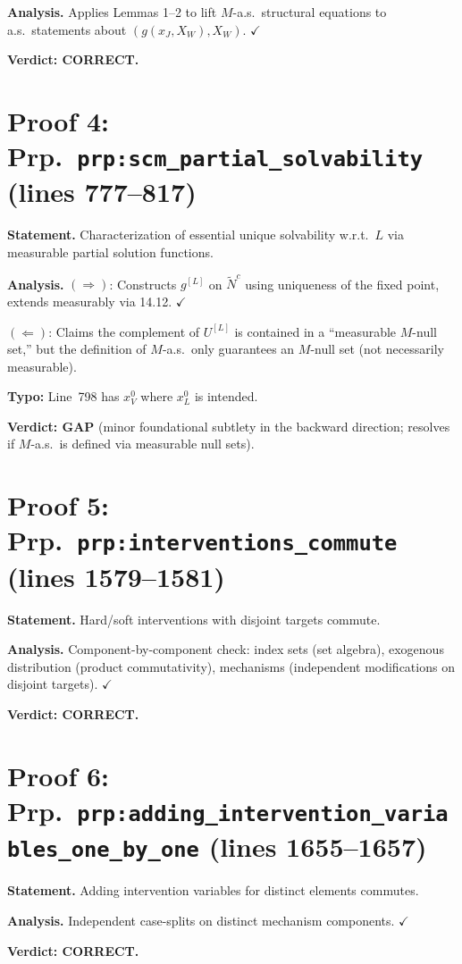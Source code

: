 \documentclass{article}
\begin{document}
\textbf{Analysis.} Applies Lemmas 1--2 to lift $M$-a.s.\ structural equations
to a.s.\ statements about $(g(x_J,X_W),X_W)$.  $\checkmark$

\textbf{Verdict: CORRECT.}

\section{Proof 4: Prp.\ \texttt{prp:scm\_partial\_solvability} (lines 777--817)}
\textbf{Statement.} Characterization of essential unique solvability w.r.t.\ $L$
via measurable partial solution functions.

\textbf{Analysis.}
$(\Rightarrow)$: Constructs $g^{[L]}$ on $\tilde N^c$ using uniqueness of the
fixed point, extends measurably via \cite{Kec95} 14.12.  $\checkmark$

$(\Leftarrow)$: Claims the complement of $U^{[L]}$ is contained in a
``measurable $M$-null set,'' but the definition of $M$-a.s.\ only guarantees
an $M$-null set (not necessarily measurable).

\textbf{Typo:} Line~798 has $x_V^0$ where $x_L^0$ is intended.

\textbf{Verdict: GAP} (minor foundational subtlety in the backward direction;
resolves if $M$-a.s.\ is defined via measurable null sets).

\section{Proof 5: Prp.\ \texttt{prp:interventions\_commute} (lines 1579--1581)}
\textbf{Statement.} Hard/soft interventions with disjoint targets commute.

\textbf{Analysis.} Component-by-component check: index sets (set algebra),
exogenous distribution (product commutativity), mechanisms (independent
modifications on disjoint targets).  $\checkmark$

\textbf{Verdict: CORRECT.}

\section{Proof 6: Prp.\ \texttt{prp:adding\_intervention\_variables\_one\_by\_one}
(lines 1655--1657)}
\textbf{Statement.} Adding intervention variables for distinct elements commutes.

\textbf{Analysis.} Independent case-splits on distinct mechanism components.
$\checkmark$

\textbf{Verdict: CORRECT.}
\end{document}

